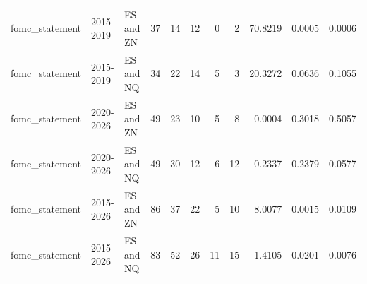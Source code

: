 \begin{tabular}{lllrrrrrrrr}
fomc_statement & 2015-2019 & ES and ZN & 37 & 14 & 12 & 0 & 2 & 70.8219 & 0.0005 & 0.0006 \\
fomc_statement & 2015-2019 & ES and NQ & 34 & 22 & 14 & 5 & 3 & 20.3272 & 0.0636 & 0.1055 \\
fomc_statement & 2020-2026 & ES and ZN & 49 & 23 & 10 & 5 & 8 & 0.0004 & 0.3018 & 0.5057 \\
fomc_statement & 2020-2026 & ES and NQ & 49 & 30 & 12 & 6 & 12 & 0.2337 & 0.2379 & 0.0577 \\
fomc_statement & 2015-2026 & ES and ZN & 86 & 37 & 22 & 5 & 10 & 8.0077 & 0.0015 & 0.0109 \\
fomc_statement & 2015-2026 & ES and NQ & 83 & 52 & 26 & 11 & 15 & 1.4105 & 0.0201 & 0.0076 \\
\bottomrule
\end{tabular}
